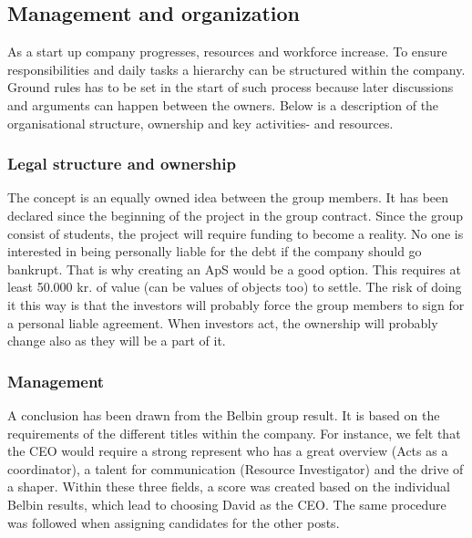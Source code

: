 \subsection{Management and organization}
As a start up company progresses, resources and workforce increase. To ensure responsibilities and daily tasks a hierarchy can be structured within the company. Ground rules has to be set in the start of such process because later discussions and arguments can happen between the owners. Below is a description of the organisational structure, ownership and key activities- and resources.

\subsubsection{Legal structure and ownership}
The concept is an equally owned idea between the group members. It has been declared since the beginning of the project in the group contract.
Since the group consist of students, the project will require funding to become a reality. No one is interested in being personally liable for the debt if the company should go bankrupt. That is why creating an ApS would be a good option. This requires at least 50.000 kr. of value (can be values of objects too) to settle. The risk of doing it this way is that the investors will probably force the group members to sign for a personal liable agreement. 
When investors act, the ownership will probably change also as they will be a part of it.
\subsubsection{Management}
A conclusion has been drawn from the Belbin group result. It is based on the requirements of the different titles within the company.  For instance, we felt that the CEO would require a strong represent who has a great overview (Acts as a coordinator), a talent for communication (Resource Investigator) and the drive of a shaper. Within these three fields, a score was created based on the individual Belbin results, which lead to choosing David as the CEO. 
The same procedure was followed when assigning candidates for the other posts. 

